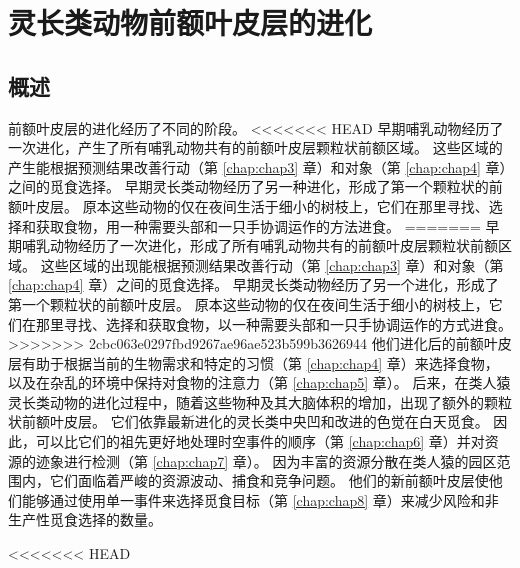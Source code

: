 




\chapter{灵长类动物前额叶皮层的进化} \label{chap:chap2}









\section{概述}











前额叶皮层的进化经历了不同的阶段。
<<<<<<< HEAD
早期哺乳动物经历了一次进化，产生了所有哺乳动物共有的前额叶皮层颗粒状前额区域。
这些区域的产生能根据预测结果改善行动（第 \ref{chap:chap3} 章）和对象（第 \ref{chap:chap4} 章）之间的觅食选择。
早期灵长类动物经历了另一种进化，形成了第一个颗粒状的前额叶皮层。
原本这些动物的仅在夜间生活于细小的树枝上，它们在那里寻找、选择和获取食物，用一种需要头部和一只手协调运作的方法进食。
=======
早期哺乳动物经历了一次进化，形成了所有哺乳动物共有的前额叶皮层颗粒状前额区域。
这些区域的出现能根据预测结果改善行动（第 \ref{chap:chap3} 章）和对象（第 \ref{chap:chap4} 章）之间的觅食选择。
早期灵长类动物经历了另一个进化，形成了第一个颗粒状的前额叶皮层。
原本这些动物的仅在夜间生活于细小的树枝上，它们在那里寻找、选择和获取食物，以一种需要头部和一只手协调运作的方式进食。
>>>>>>> 2cbc063e0297fbd9267ae96ae523b599b3626944
他们进化后的前额叶皮层有助于根据当前的生物需求和特定的习惯（第 \ref{chap:chap4} 章）来选择食物，以及在杂乱的环境中保持对食物的注意力（第 \ref{chap:chap5} 章）。
后来，在类人猿灵长类动物的进化过程中，随着这些物种及其大脑体积的增加，出现了额外的颗粒状前额叶皮层。
它们依靠最新进化的灵长类中央凹和改进的色觉在白天觅食。
因此，可以比它们的祖先更好地处理时空事件的顺序（第 \ref{chap:chap6} 章）并对资源的迹象进行检测（第 \ref{chap:chap7} 章）。
因为丰富的资源分散在类人猿的园区范围内，它们面临着严峻的资源波动、捕食和竞争问题。
他们的新前额叶皮层使他们能够通过使用单一事件来选择觅食目标（第 \ref{chap:chap8} 章）来减少风险和非生产性觅食选择的数量。








<<<<<<< HEAD

